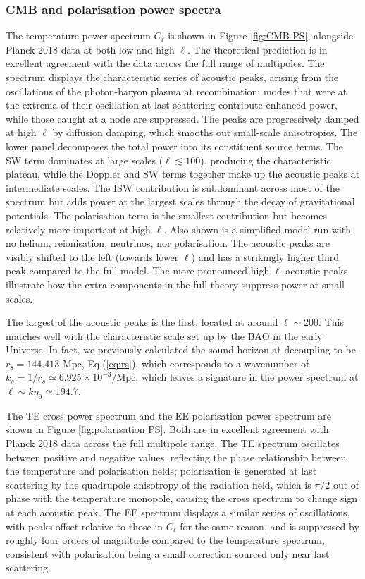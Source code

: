 \documentclass[twocolumn]{aa}
\begin{document}
\subsubsection{CMB and polarisation power spectra}
The temperature power spectrum $C_\ell$ is shown in Figure \ref{fig:CMB PS}, alongside Planck 2018 data \citep{planck2020} at both low and high $\ell$. The theoretical prediction is in excellent agreement with the data across the full range of multipoles. The spectrum displays the characteristic series of acoustic peaks, arising from the oscillations of the photon-baryon plasma at recombination: modes that were at the extrema of their oscillation at last scattering contribute enhanced power, while those caught at a node are suppressed. The peaks are progressively damped at high $\ell$ by diffusion damping, which smooths out small-scale anisotropies. The lower panel decomposes the total power into its constituent source terms. The SW term dominates at large scales ($\ell \lesssim 100$), producing the characteristic plateau, while the Doppler and SW terms together make up the acoustic peaks at intermediate scales. The ISW contribution is subdominant across most of the spectrum but adds power at the largest scales through the decay of gravitational potentials. The polarisation term is the smallest contribution but becomes relatively more important at high $\ell$. Also shown is a simplified model run with no helium, reionisation, neutrinos, nor polarisation. The acoustic peaks are visibly shifted to the left (towards lower $\ell$) and has a strikingly higher third peak compared to the full model. The more pronounced high $\ell$ acoustic peaks illustrate how the extra components in the full theory suppress power at small scales.

The largest of the acoustic peaks is the first, located at around $\ell\sim 200$. This matches well with the characteristic scale set up by the BAO in the early Universe. In fact, we previously calculated the sound horizon at decoupling to be $r_s=144.413\mbox{ Mpc}$, Eq.(\ref{eq:rs}), which corresponds to a wavenumber of $k_s = 1/r_s \simeq 6.925\times 10^{-3} /\mbox{Mpc}$, which leaves a signature in the power spectrum at $\ell\sim k\eta_0 \simeq 194.7$.

The TE cross power spectrum and the EE polarisation power spectrum are shown in Figure \ref{fig:polarisation PS}. Both are in excellent agreement with Planck 2018 data across the full multipole range. The TE spectrum oscillates between positive and negative values, reflecting the phase relationship between the temperature and polarisation fields; polarisation is generated at last scattering by the quadrupole anisotropy of the radiation field, which is $\pi/2$ out of phase with the temperature monopole, causing the cross spectrum to change sign at each acoustic peak. The EE spectrum displays a similar series of oscillations, with peaks offset relative to those in $C_\ell$ for the same reason, and is suppressed by roughly four orders of magnitude compared to the temperature spectrum, consistent with polarisation being a small correction sourced only near last scattering.
\end{document}
